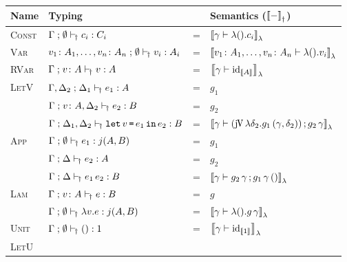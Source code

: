\documentclass[runningheads,envcountsame]{llncs}
\begin{document}
    \begin{figure}
    \centering
    {\def\arraystretch{1.5}
    \begin{tabular}{l|l c l}
          Name & Typing & & Semantics ($\semD{-}$) \\
          \hline\hline
          \textsc{Const}
        & $\typeruled{\Gamma}{\emptyset}{c_i}{\fun}{C_i}$
        & = & $\semL{\gamma \vdash \elam{\eunit}{c_i}}$ 
        \\ \hline
          \textsc{Var}
        & $\typeruled{v_1\colon A_1, \dots, v_n\colon A_n}{\emptyset}{v_i}{\fun}{A_i}$
        & = & $\semL{v_1\colon A_1, \dots, v_n\colon A_n \vdash \elam{\eunit}{v_i}}$ 
        \\ \hline
          \textsc{RVar}
        & $\typeruled{\Gamma}{v\colon A}{v}{\js}{A}$
        & = & $\semL{\gamma \vdash \id_{\sem{A}}}$ 
        \\ \hline
          \multirow{3}{*}{\textsc{LetV}}
        & $\typeruled{\Gamma, \Delta_2}{\Delta_1}{e_1}{j}{A}$ 
        & = & $g_1$ \\ 
        & $\typeruled{\Gamma}{v\colon A, \Delta_2}{e_2}{j}{B}$
        & = & $g_2$ \\ \cline{2-2}
        & $\typeruled{\Gamma}{\Delta_1, \Delta_2}{\elet{v}{e_1}{e_2}}{j}{B}$
        & = & $\semL{\gamma \vdash \comp{(\juncurry\,\elam{\delta_2}{\eapp{g_1}{\epair{\gamma}{\delta_2}}})}{\eapp{g_2}{\gamma}}}$ 
        \\ \hline
          \multirow{3}{*}{\textsc{App}}
        & $\typeruled{\Gamma}{\emptyset}{e_1}{\fun}{\homJ{A}{j}{B}}$ 
        & = & $g_1$ \\ 
        & $\typeruled{\Gamma}{\Delta}{e_2}{j}{A}$
        & = & $g_2$ \\ \cline{2-2}
        & $\typeruled{\Gamma}{\Delta}{\eapp{e_1}{e_2}}{j}{B}$
        & = & $\semL{\gamma \vdash \comp{\eapp{g_2}{\gamma}}{\eapp{\eapp{g_1}{\gamma}}{\eunit}}}$ 
        \\ \hline
          \multirow{2}{*}{\textsc{Lam}}
        & $\typeruled{\Gamma}{v\colon A}{e}{j}{B}$
        & = & $g$ \\ \cline{2-2}
        & $\typeruled{\Gamma}{\emptyset}{\elam{v}{e}}{\fun}{\homJ{A}{j}{B}}$
        & = & $\semL{\gamma \vdash \elam{\eunit}{\eapp{g}{\gamma}}}$ 
        \\ \hline
          \textsc{Unit}
        & $\typeruled{\Gamma}{\emptyset}{\eunit}{j}{\tunit}$
        & = & $\semL{\gamma \vdash \id_{\sem{\tunit}}}$ 
        \\ \hline
          \multirow{3}{*}{\textsc{LetU}}

\end{tabular}}
\end{figure}
\end{document}
